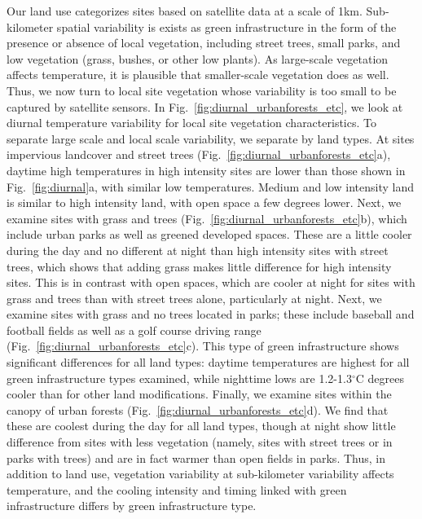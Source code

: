 Our land use categorizes sites based on satellite data at a scale of 1km.  Sub-kilometer spatial variability is exists as green infrastructure in the form of the presence or absence of local vegetation, including street trees, small parks, and low vegetation (grass, bushes, or other low plants). As large-scale vegetation affects temperature, it is plausible that smaller-scale vegetation does as well. 
Thus, we now turn to local site vegetation whose variability is too small to be captured by satellite sensors. 
In Fig.~\ref{fig:diurnal_urbanforests_etc}, we look at diurnal temperature variability for local site vegetation characteristics. To separate large scale and local scale variability, we separate by land types. At sites impervious landcover and street trees (Fig.~\ref{fig:diurnal_urbanforests_etc}a), daytime high temperatures in high intensity sites are lower than those shown in Fig.~\ref{fig:diurnal}a, with similar low temperatures. Medium and low intensity land is similar to high intensity land, with open space a few degrees lower. Next, we examine sites with grass and trees (Fig.~\ref{fig:diurnal_urbanforests_etc}b), which include urban parks as well as greened developed spaces. These are a little cooler during the day and no different at night than high intensity sites with street trees, which shows that adding grass makes little difference for high intensity sites. This is in contrast with open spaces, which are cooler at night for sites with grass and trees than with street trees alone, particularly at night. Next, we examine sites with grass and no trees located in parks; these include baseball and football fields as well as a golf course driving range (Fig.~\ref{fig:diurnal_urbanforests_etc}c). This type of green infrastructure shows significant differences for all land types: daytime temperatures are highest for all green infrastructure types examined, while nighttime lows are 1.2-1.3$^\circ$C degrees cooler than for other land modifications. 
Finally, we examine sites within the canopy of urban forests (Fig.~\ref{fig:diurnal_urbanforests_etc}d). 
We find that these are coolest during the day for all land types, though at night show little difference from sites with less vegetation (namely, sites with street trees or in parks with trees) and are in fact warmer than open fields in parks. 
Thus, in addition to land use, vegetation variability at sub-kilometer variability affects temperature, and the cooling intensity and timing linked with green infrastructure differs by green infrastructure type. 

